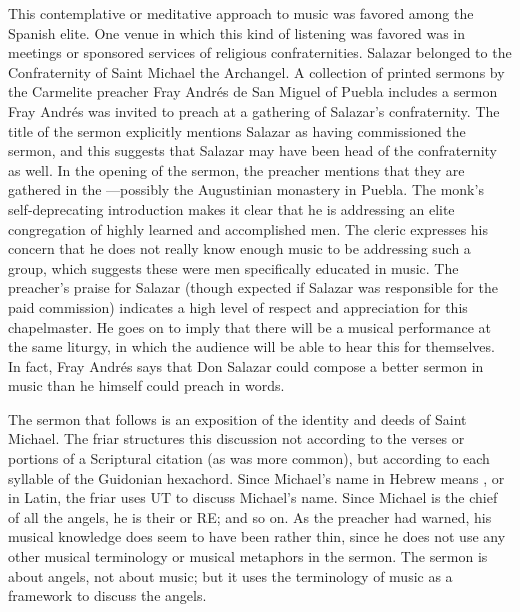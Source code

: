 This contemplative or meditative approach to music was favored among the
Spanish elite.
One venue in which this kind of listening was favored was in meetings or
sponsored services of religious confraternities.
Salazar belonged to the Confraternity of Saint Michael the Archangel.
A collection of printed sermons by the Carmelite preacher Fray Andrés de San
Miguel of Puebla includes a sermon Fray Andrés was invited to preach at a
gathering of Salazar's confraternity.
The title of the sermon explicitly mentions Salazar as having commissioned the
sermon, and this suggests that Salazar may have been head of the confraternity
as well. 
In the opening of the sermon, the preacher mentions that they are gathered in
the ---possibly the Augustinian monastery in
Puebla.
The monk's self-deprecating introduction makes it clear that he is addressing
an elite congregation of highly learned and accomplished men.
The cleric expresses his concern that he does not really know enough music to
be addressing such a group, which suggests these were men specifically educated
in music.
The preacher's praise for Salazar (though expected if Salazar was responsible
for the paid commission) indicates a high level of respect and appreciation for
this chapelmaster.
He goes on to imply that there will be a musical performance at the same
liturgy, in which the audience will be able to hear this for themselves.
In fact, Fray Andrés says that Don Salazar could compose a better sermon in
music than he himself could preach in words. 

The sermon that follows is an exposition of the identity and deeds of
Saint Michael.
The friar structures this discussion not according to the verses or portions of
a Scriptural citation (as was more common), but according to each syllable of
the Guidonian hexachord.
Since Michael's name in Hebrew means , or
 in Latin, the friar uses UT to discuss Michael's name.
Since Michael is the chief of all the angels, he is their  or RE;
and so on.
As the preacher had warned, his musical knowledge does seem to have been rather
thin, since he does not use any other musical terminology or musical metaphors
in the sermon. 
The sermon is about angels, not about music; but it uses the terminology of
music as a framework to discuss the angels.

